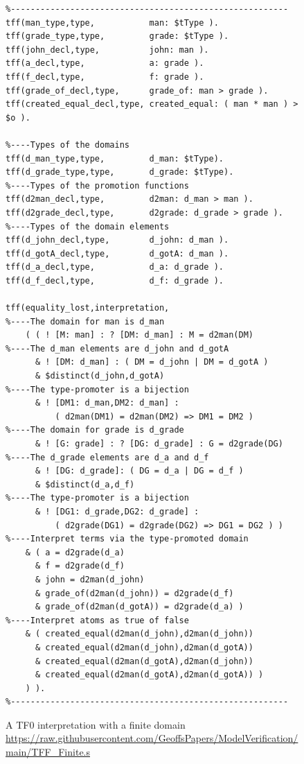 \documentclass{easychair}
\begin{document}
\begin{figure}[htbp]
\small
{}
\begin{verbatim}
%--------------------------------------------------------
tff(man_type,type,           man: $tType ).
tff(grade_type,type,         grade: $tType ).
tff(john_decl,type,          john: man ).
tff(a_decl,type,             a: grade ).
tff(f_decl,type,             f: grade ).
tff(grade_of_decl,type,      grade_of: man > grade ).
tff(created_equal_decl,type, created_equal: ( man * man ) > $o ).

%----Types of the domains
tff(d_man_type,type,         d_man: $tType).
tff(d_grade_type,type,       d_grade: $tType).
%----Types of the promotion functions
tff(d2man_decl,type,         d2man: d_man > man ).
tff(d2grade_decl,type,       d2grade: d_grade > grade ).
%----Types of the domain elements
tff(d_john_decl,type,        d_john: d_man ).
tff(d_gotA_decl,type,        d_gotA: d_man ).
tff(d_a_decl,type,           d_a: d_grade ).
tff(d_f_decl,type,           d_f: d_grade ).

tff(equality_lost,interpretation,
%----The domain for man is d_man
    ( ( ! [M: man] : ? [DM: d_man] : M = d2man(DM)
%----The d_man elements are d_john and d_gotA
      & ! [DM: d_man] : ( DM = d_john | DM = d_gotA )
      & $distinct(d_john,d_gotA)
%----The type-promoter is a bijection
      & ! [DM1: d_man,DM2: d_man] :
          ( d2man(DM1) = d2man(DM2) => DM1 = DM2 )
%----The domain for grade is d_grade
      & ! [G: grade] : ? [DG: d_grade] : G = d2grade(DG)
%----The d_grade elements are d_a and d_f
      & ! [DG: d_grade]: ( DG = d_a | DG = d_f )
      & $distinct(d_a,d_f)
%----The type-promoter is a bijection
      & ! [DG1: d_grade,DG2: d_grade] :
          ( d2grade(DG1) = d2grade(DG2) => DG1 = DG2 ) )
%----Interpret terms via the type-promoted domain
    & ( a = d2grade(d_a)
      & f = d2grade(d_f)
      & john = d2man(d_john)
      & grade_of(d2man(d_john)) = d2grade(d_f)
      & grade_of(d2man(d_gotA)) = d2grade(d_a) )
%----Interpret atoms as true of false
    & ( created_equal(d2man(d_john),d2man(d_john))
      & created_equal(d2man(d_john),d2man(d_gotA))
      & created_equal(d2man(d_gotA),d2man(d_john))
      & created_equal(d2man(d_gotA),d2man(d_gotA)) ) 
    ) ).
%--------------------------------------------------------
\end{verbatim}
\caption{A TF0 interpretation with a finite domain \\
{\footnotesize \url{https://raw.githubusercontent.com/GeoffsPapers/ModelVerification/main/TFF_Finite.s}}}
\label{TF0FiniteInterpretation}
\end{figure}
\end{document}
